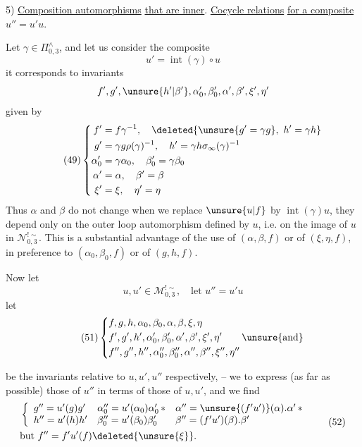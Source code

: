 
5) \uline{Composition  automorphisms} \uline{that are inner}. \uline{Cocycle relations} \uline{for a composite} $u''=u'u$.

Let $\gamma\in\Pi_{0,3}^{\wedge}$, and let us consider the composite
\[
\tag{48}
u'=\operatorname{int}(\gamma)\circ u
\]
it corresponds to invariants
\[
f',g',\unsure{h'|\beta'},\alpha_0',\beta_0',\alpha',\beta',\xi',\eta'
\]
given by
\[
\tag{49}
\left\{\begin{aligned}
f'&=f\gamma^{-1},\quad\deleted{\unsure{g'=\gamma g},\ h'=\gamma h}\\
g'&=\gamma g\rho(\gamma)^{-1},\quad h'=\gamma h\sigma_\infty(\gamma)^{-1}\\
\alpha_0'&=\gamma\alpha_0,\quad\beta_0'=\gamma\beta_0\\
\alpha'&=\alpha,\quad\beta'=\beta\\
\xi'&=\xi,\quad\eta'=\eta
\end{aligned}\right.
\]
Thus $\alpha$ and $\beta$ do not change when we replace $\unsure{u|f}$ by $\operatorname{int}(\gamma)u$, they depend only on the outer loop automorphism defined by $u$, i.e. on the image of $u$ in $\mathcal{N}_{0,3}^{!\sim}$. This is a substantial advantage of the use of $(\alpha,\beta,f)$ or of $(\xi,\eta,f)$, in preference to $(\alpha_0,\beta_0,f)$ or of $(g,h,f)$.

Now let
\[
\tag{50}
u,u'\in\mathcal{M}_{0,3}^{!\sim},\quad\text{let }u''=u'u
\]
let
\[
\tag{51}
\left\{\begin{aligned}
&f,g,h,\alpha_0,\beta_0,\alpha,\beta,\xi,\eta\\
&f',g',h',\alpha_0',\beta_0',\alpha',\beta',\xi',\eta'\qquad\unsure{\text{and}}\\
&f'',g'',h'',\alpha_0'',\beta_0'',\alpha'',\beta'',\xi'',\eta''
\end{aligned}\right.
\]


be the invariants relative to $u,u',u''$ respectively, -- we  to express (as far as possible) those of $u''$ in terms of those of $u,u'$, and we find
\[
\begin{aligned}
&\left\{\begin{array}{lll}
g''=u'(g)g' & \alpha_0''=u'(\alpha_0)\alpha_0'\, {*} & \alpha''=\unsure{(f'u')}(\alpha).\alpha'\, {*}\\
h''=u'(h)h' & \beta_0''=u'(\beta_0)\beta_0' & \beta''=(f'u')(\beta).\beta'
\end{array}\right.\\
&\text{but } f''=f'u'(f)\deleted{\unsure{\xi}}.
\end{aligned}
\tag{52}
\]

